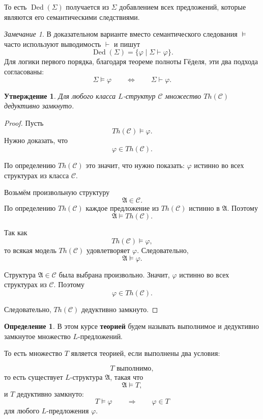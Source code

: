 \documentclass[12pt,a4paper,oneside,openany]{book}
\theoremstyle{definition}
\newtheorem{definition}{Определение}[chapter]
\theoremstyle{plain}
\newtheorem{proposition}{Утверждение}[chapter]
\theoremstyle{remark}
\newtheorem{remark}{Замечание}[chapter]
\begin{document}
То есть $\operatorname{Ded}(\Sigma)$ получается из $\Sigma$ добавлением всех предложений, которые являются его семантическими следствиями.

\begin{remark}
В доказательном варианте вместо семантического следования $\models$ часто используют выводимость $\vdash$ и пишут
\[
\operatorname{Ded}(\Sigma)
=
\{\varphi\mid \Sigma\vdash\varphi\}.
\]
Для логики первого порядка, благодаря теореме полноты Гёделя, эти два подхода согласованы:
\[
\Sigma\models\varphi
\qquad
\Longleftrightarrow
\qquad
\Sigma\vdash\varphi.
\]
\end{remark}

\begin{proposition}
Для любого класса $L$-структур $\mathcal C$ множество $Th(\mathcal C)$ дедуктивно замкнуто.
\end{proposition}

\begin{proof}
Пусть
\[
Th(\mathcal C)\models\varphi.
\]
Нужно доказать, что
\[
\varphi\in Th(\mathcal C).
\]

По определению $Th(\mathcal C)$ это значит, что нужно показать: $\varphi$ истинно во всех структурах из класса $\mathcal C$.

Возьмём произвольную структуру
\[
\mathfrak A\in\mathcal C.
\]
По определению $Th(\mathcal C)$ каждое предложение из $Th(\mathcal C)$ истинно в $\mathfrak A$. Поэтому
\[
\mathfrak A\models Th(\mathcal C).
\]

Так как
\[
Th(\mathcal C)\models\varphi,
\]
то всякая модель $Th(\mathcal C)$ удовлетворяет $\varphi$. Следовательно,
\[
\mathfrak A\models\varphi.
\]

Структура $\mathfrak A\in\mathcal C$ была выбрана произвольно. Значит, $\varphi$ истинно во всех структурах из $\mathcal C$. Поэтому
\[
\varphi\in Th(\mathcal C).
\]

Следовательно, $Th(\mathcal C)$ дедуктивно замкнуто.
\end{proof}

\begin{definition}
В этом курсе \textbf{теорией} будем называть выполнимое и дедуктивно замкнутое множество $L$-предложений.
\end{definition}

То есть множество $T$ является теорией, если выполнены два условия:

\[
T\text{ выполнимо},
\]
то есть существует $L$-структура $\mathfrak A$, такая что
\[
\mathfrak A\models T,
\]
и $T$ дедуктивно замкнуто:
\[
T\models\varphi
\qquad
\Longrightarrow
\qquad
\varphi\in T
\]
для любого $L$-предложения $\varphi$.
\end{document}
